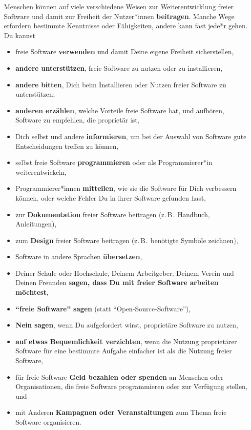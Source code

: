 \documentclass[a5paper,12pt]{scrartcl}
\begin{document}
Menschen können auf viele verschiedene Weisen zur Weiterentwicklung
freier Software und damit zur Freiheit der Nutzer*innen
\textbf{beitragen}. Manche Wege erfordern bestimmte Kenntnisse oder
Fähigkeiten, andere kann fast jede*r gehen. Du kannst

\begin{itemize}
\item freie Software \textbf{verwenden} und damit Deine eigene
  Freiheit sicherstellen,
\item \textbf{andere unterstützen}, freie Software zu nutzen oder zu
  installieren,
\item \textbf{andere bitten}, Dich beim Installieren oder Nutzen
  freier Software zu unterstützen,
\item \textbf{anderen erzählen}, welche Vorteile freie Software hat,
  und aufhören, Software zu empfehlen, die proprietär ist,
\item Dich selbst und andere \textbf{informieren}, um bei der Auswahl
  von Software gute Entscheidungen treffen zu können,
\item selbst freie Software \textbf{programmieren} oder als
  Programmierer*in weiterentwickeln,
\item Programmierer*innen \textbf{mitteilen}, wie sie die Software für
  Dich verbessern können, oder welche Fehler Du in ihrer Software
  gefunden hast,
\item zur \textbf{Dokumentation} freier Software beitragen (z.\,B.\
  Handbuch, Anleitungen),
\item zum \textbf{Design} freier Software beitragen (z.\,B.\ benötigte
  Symbole zeichnen),
\item Software in andere Sprachen \textbf{übersetzen},
\item Deiner Schule oder Hochschule, Deinem Arbeitgeber, Deinem Verein
  und Deinen Freunden \textbf{sagen, dass Du mit freier Software
  arbeiten möchtest},
\item \textbf{"`freie Software"' sagen} (statt
  "`Open-Source-Software"'),
\item \textbf{Nein sagen}, wenn Du aufgefordert wirst, proprietäre
  Software zu nutzen,
\item \textbf{auf etwas Bequemlichkeit verzichten}, wenn die Nutzung
  proprietärer Software für eine bestimmte Aufgabe einfacher ist als
  die Nutzung freier Software,
\item für freie Software \textbf{Geld bezahlen oder spenden} an
  Menschen oder Organisationen, die freie Software programmieren oder
  zur Verfügung stellen, und
\item mit Anderen \textbf{Kampagnen oder Veranstaltungen} zum Thema
  freie Software organisieren.
\end{itemize}
\end{document}
